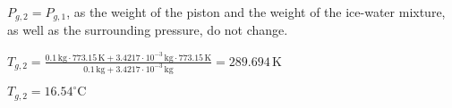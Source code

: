 \( P_{g,2} = P_{g,1} \), as the weight of the piston and the weight of the ice-water mixture, as well as the surrounding pressure, do not change.  

\( T_{g,2} = \frac{0.1 \, \text{kg} \cdot 773.15 \, \text{K} + 3.4217 \cdot 10^{-3} \, \text{kg} \cdot 773.15 \, \text{K}}{0.1 \, \text{kg} + 3.4217 \cdot 10^{-3} \, \text{kg}} = 289.694 \, \text{K} \)  

\( T_{g,2} = 16.54^\circ \text{C} \)
